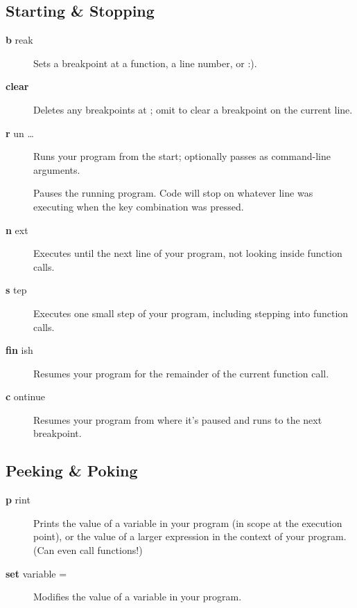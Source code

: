 \documentclass{tufte-handout}
\newcommand\dbc[2]{{%
  \sffamily\upshape\mdseries
  \textbf{{#1}}%
  #2}}
\begin{document}
\subsection{Starting \& Stopping}
\begin{description}

  \item[\dbc{b}{reak} ] Sets a breakpoint at a function, a
    line number, or :).

  \item[\dbc{clear}{} ] Deletes any breakpoints at
    ; omit  to clear a breakpoint on the current
    line.

  \item[\dbc{r}{un} \ldots] Runs your program from the start;
    optionally passes  as command-line arguments.

  \item[] Pauses the running program. Code will stop on
    whatever line was executing when the key combination was pressed.

  \item[\dbc{n}{ext}] Executes until the next line of your program, not
    looking inside function calls.

  \item[\dbc{s}{tep}] Executes one small step of your program, including
    stepping into function calls.

  \item[\dbc{fin}{ish}] Resumes your program for the remainder of the
    current function call.

  \item[\dbc{c}{ontinue}] Resumes your program from where it’s paused
    and runs to the next breakpoint.

\end{description}

\subsection{Peeking \& Poking}
\begin{description}

  \item[\dbc{p}{rint} ] Prints the value of a variable in your
    program (in scope at the execution point), or the value of a larger
    expression in the context of your program. (Can even call
    functions!)

  \item[\dbc{set}{ variable}  = ] Modifies the
    value of a variable in your program.

\end{description}
\end{document}
